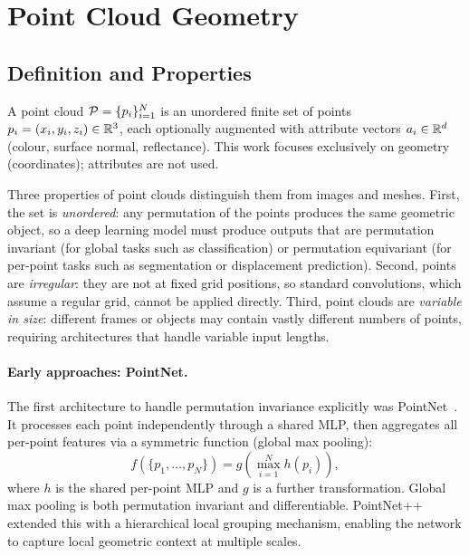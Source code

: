 \section{Point Cloud Geometry}
\label{sec:3d-representations}

\subsection{Definition and Properties}

A point cloud $\mathcal{P} = \{p_i\}_{i=1}^{N}$ is an unordered finite set of
points $p_i = (x_i, y_i, z_i) \in \mathbb{R}^3$, each optionally augmented with
attribute vectors $a_i \in \mathbb{R}^d$ (colour, surface normal, reflectance).
This work focuses exclusively on geometry (coordinates); attributes are not
used.

Three properties of point clouds distinguish them from images and meshes.
First, the set is \emph{unordered}: any permutation of the points produces
the same geometric object, so a deep learning model must produce outputs that
are permutation invariant (for global tasks such as classification) or
permutation equivariant (for per-point tasks such as segmentation or
displacement prediction).
Second, points are \emph{irregular}: they are not at fixed grid positions,
so standard convolutions, which assume a regular grid, cannot be applied
directly.
Third, point clouds are \emph{variable in size}: different frames or objects
may contain vastly different numbers of points, requiring architectures that
handle variable input lengths.

\paragraph{Early approaches: PointNet.}
The first architecture to handle permutation invariance explicitly was
PointNet~\cite{qi2017pointnet}.
It processes each point independently through a shared MLP, then aggregates
all per-point features via a symmetric function (global max pooling):
\begin{equation}
  f(\{p_1, \ldots, p_N\}) = g\!\left(\max_{i=1}^N h(p_i)\right),
\end{equation}
where $h$ is the shared per-point MLP and $g$ is a further transformation.
Global max pooling is both permutation invariant and differentiable.
PointNet++ \cite{qi2017pointnetplusplus} extended this with a hierarchical
local grouping mechanism, enabling the network to capture local geometric
context at multiple scales.

